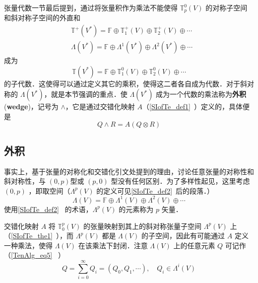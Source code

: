 
\begin{issues}
\issueMissDepend
{}
\end{issues}




张量代数一节最后提到，通过将张量积作为乘法不能使得 $\mathbb T_p^0(V)$ 的对称子空间和斜对称子空间的外直和 
\begin{equation}
\begin{aligned}
&\mathbb T^+(V^*)=\mathbb F\oplus\mathbb T_1^+(V)\oplus\mathbb T_2^+(V)\oplus\cdots\\
&\Lambda(V^*)=\mathbb F\oplus \Lambda^1(V^*)\oplus\Lambda^2(V^*)\oplus\cdots
\end{aligned}
\end{equation}
成为 
\begin{equation}
\mathbb T(V^*)=\mathbb F\oplus\mathbb T_1^0(V)\oplus\mathbb T_2^0(V)\oplus\cdots
\end{equation}
的子代数．这使得可以通过定义其它的乘积，使得这二者各自成为代数．对于斜对称的 $\Lambda(V^*)$，就是本节强调的重点．使 $\Lambda(V^*)$ 成为一个代数的乘法称为\textbf{外积}(\textbf{wedge})，记号为 $\wedge$，它是通过交错化映射 $A$（\autoref{SIofTe_def1}~）定义的，具体便是
\begin{equation}
Q\wedge R=A(Q\otimes R)
\end{equation}

\subsection{外积}
事实上，基于张量的对称化和交错化引文处提到的理由，讨论任意张量的对称性和斜对称性，与 $(0,p)$型或 $(p,0)$ 型没有任何区别．为了多样性起见，这里考虑 $(0,p)$ ，即取空间（$\Lambda^p(V)$ 的定义可见\autoref{SIofTe_def2}~后的段落．） 
\begin{equation}\label{ExtAlg_eq8}
\Lambda(V)=\mathbb F\oplus \Lambda^1(V)\oplus\Lambda^2(V)\oplus\cdots
\end{equation}
使用\autoref{SIofTe_def2}~ 的术语，$\Lambda^p(V)$ 的元素称为 $p$ 矢量．

交错化映射 $A$ 将 $\mathbb T_0^p(V)$ 的张量映射到其上的斜对称张量子空间 $\Lambda^p(V)$ 上（\autoref{SIofTe_the1}~），而 $\Lambda^p(V)$ 都是 $\Lambda(V)$ 的子空间，因此有可能通过 $A$ 定义一种乘法，使得 $\Lambda(V)$ 在该乘法下封闭．注意 $ \Lambda(V)$ 上的任意元素 $Q$ 可记作（\autoref{TenAlg_eq5}~ ）
\begin{equation}\label{ExtAlg_eq3}
Q=\sum_{i=0}^\infty Q_i=(Q_0,Q_1,\cdots),\quad Q_i\in\Lambda^i(V)
\end{equation}

